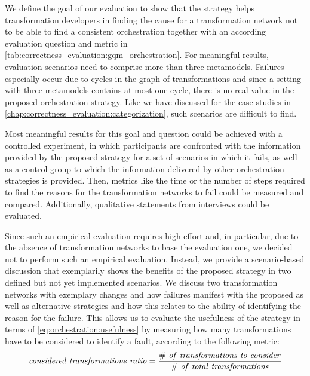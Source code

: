 We define the goal of our evaluation to show that the strategy helps transformation developers in finding the cause for a transformation network not to be able to find a consistent orchestration together with an according evaluation question and metric in \autoref{tab:correctness_evaluation:gqm_orchestration}.
For meaningful results, evaluation scenarios need to comprise more than three metamodels.
Failures especially occur due to cycles in the graph of transformations and since a setting with three metamodels contains at most one cycle, there is no real value in the proposed orchestration strategy.
Like we have discussed for the case studies in \autoref{chap:correctness_evaluation:categorization}, such scenarios are difficult to find.

Most meaningful results for this goal and question could be achieved with a controlled experiment, in which participants are confronted with the information provided by the proposed strategy for a set of scenarios in which it fails, as well as a control group to which the information delivered by other orchestration strategies is provided.
Then, metrics like the time or the number of steps required to find the reasons for the transformation networks to fail could be measured and compared.
Additionally, qualitative statements from interviews could be evaluated.

Since such an empirical evaluation requires high effort and, in particular, due to the absence of transformation networks to base the evaluation one, we decided not to perform such an empirical evaluation.
Instead, we provide a scenario-based discussion that exemplarily shows the benefits of the proposed strategy in two defined but not yet implemented scenarios.
We discuss two transformation networks with exemplary changes and how failures manifest with the proposed as well as alternative strategies and how this relates to the ability of identifying the reason for the failure.
This allows us to evaluate the usefulness of the strategy in terms of \autoref{eq:orchestration:usefulness} by measuring how many transformations have to be considered to identify a fault, according to the following metric:
\begin{align*}
    \mathvariable{considered\ transformations\ ratio = \frac{\#\ of\ transformations\ to\ consider%
    }{\#\ of\ total\ transformations}}
\end{align*}


